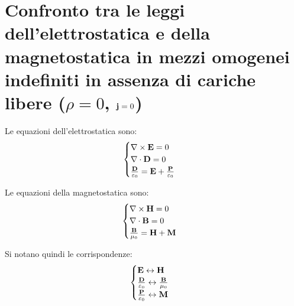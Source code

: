 \section{Confronto tra le leggi dell'elettrostatica e della magnetostatica in mezzi omogenei indefiniti in assenza di cariche libere ($\rho=0$, $\mathbf{j}=0$)}%
Le equazioni dell'elettrostatica sono:
\begin{equation}\begin{split}
\begin{cases}
\nabla\times\mathbf{E}=0\\
\nabla\cdot\mathbf{D}=0\\
\frac{\mathbf{D}}{\varepsilon_0}=\mathbf{E}+\frac{\mathbf{P}}{\varepsilon_0}
\end{cases}
\end{split}\end{equation}

Le equazioni della magnetostatica sono:
\begin{equation}\begin{split}
\begin{cases}
\nabla\times\mathbf{H}=0\\
\nabla\cdot\mathbf{B}=0\\
\frac{\mathbf{B}}{\mu_0}=\mathbf{H}+\mathbf{M}
\end{cases}
\end{split}\end{equation}

Si notano quindi le corrispondenze:
\begin{equation}\begin{split}
\begin{cases}
\mathbf{E}\leftrightarrow\mathbf{H}\\
\frac{\mathbf{D}}{\varepsilon_0}\leftrightarrow\frac{\mathbf{B}}{\mu_0}\\
\frac{\mathbf{P}}{\varepsilon_0}\leftrightarrow \mathbf{M}
\end{cases}
\end{split}\end{equation}

